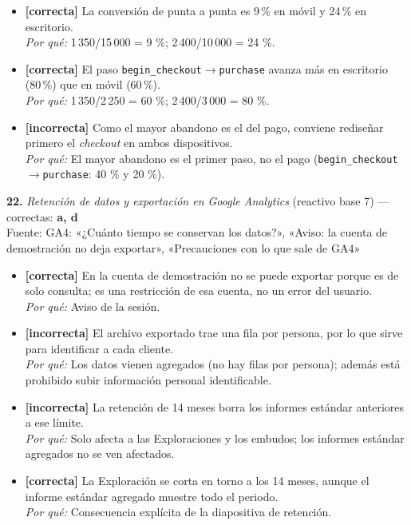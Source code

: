 \documentclass[10pt,letterpaper]{article}
\begin{document}
{\begin{itemize}[leftmargin=1.2em,itemsep=0pt,topsep=1pt,parsep=0pt]
\item[\textbf{b)}] {\footnotesize \textbf{[correcta]} La conversión de punta a punta es 9\,\% en móvil y 24\,\% en escritorio.\\ \textit{Por qué:} 1\,350/15\,000 = 9 \%; 2\,400/10\,000 = 24 \%.}
\item[\textbf{c)}] {\footnotesize \textbf{[correcta]} El paso \texttt{begin\_checkout}$\to$\texttt{purchase} avanza más en escritorio (80\,\%) que en móvil (60\,\%).\\ \textit{Por qué:} 1\,350/2\,250 = 60 \%; 2\,400/3\,000 = 80 \%.}
\item[\textbf{d)}] {\footnotesize \textbf{[incorrecta]} Como el mayor abandono es el del pago, conviene rediseñar primero el \textit{checkout} en ambos dispositivos.\\ \textit{Por qué:} El mayor abandono es el primer paso, no el pago (\texttt{begin\_checkout}$\to$\texttt{purchase}: 40 \% y 20 \%).}
\end{itemize}
\vspace{3pt}\noindent\textbf{22.} \textit{Retención de datos y exportación en Google Analytics} (reactivo base 7) — correctas: \textbf{a, d}\\[-1pt]
{\scriptsize Fuente: GA4: «¿Cuánto tiempo se conservan los datos?», «Aviso: la cuenta de demostración no deja exportar», «Precauciones con lo que sale de GA4»}
\begin{itemize}[leftmargin=1.2em,itemsep=0pt,topsep=1pt,parsep=0pt]
\item[\textbf{a)}] {\footnotesize \textbf{[correcta]} En la cuenta de demostración no se puede exportar porque es de solo consulta; es una restricción de esa cuenta, no un error del usuario.\\ \textit{Por qué:} Aviso de la sesión.}
\item[\textbf{b)}] {\footnotesize \textbf{[incorrecta]} El archivo exportado trae una fila por persona, por lo que sirve para identificar a cada cliente.\\ \textit{Por qué:} Los datos vienen agregados (no hay filas por persona); además está prohibido subir información personal identificable.}
\item[\textbf{c)}] {\footnotesize \textbf{[incorrecta]} La retención de 14 meses borra los informes estándar anteriores a ese límite.\\ \textit{Por qué:} Solo afecta a las Exploraciones y los embudos; los informes estándar agregados no se ven afectados.}
\item[\textbf{d)}] {\footnotesize \textbf{[correcta]} La Exploración se corta en torno a los 14 meses, aunque el informe estándar agregado muestre todo el periodo.\\ \textit{Por qué:} Consecuencia explícita de la diapositiva de retención.}

\end{itemize}}
\end{document}
